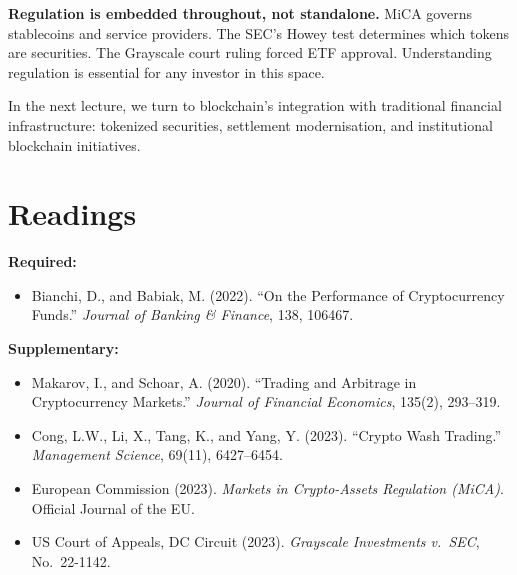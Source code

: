 \documentclass[11pt,a4paper]{article}
\begin{document}
\textbf{Regulation is embedded throughout, not standalone.} MiCA governs stablecoins and service providers. The SEC's Howey test determines which tokens are securities. The Grayscale court ruling forced ETF approval. Understanding regulation is essential for any investor in this space.

In the next lecture, we turn to blockchain's integration with traditional financial infrastructure: tokenized securities, settlement modernisation, and institutional blockchain initiatives.

\section*{Readings}

\textbf{Required:}
\begin{itemize}
    \item Bianchi, D., and Babiak, M. (2022). ``On the Performance of Cryptocurrency Funds.'' \textit{Journal of Banking \& Finance}, 138, 106467.
\end{itemize}

\textbf{Supplementary:}
\begin{itemize}
    \item Makarov, I., and Schoar, A. (2020). ``Trading and Arbitrage in Cryptocurrency Markets.'' \textit{Journal of Financial Economics}, 135(2), 293--319.
    \item Cong, L.W., Li, X., Tang, K., and Yang, Y. (2023). ``Crypto Wash Trading.'' \textit{Management Science}, 69(11), 6427--6454.
    \item European Commission (2023). \textit{Markets in Crypto-Assets Regulation (MiCA)}. Official Journal of the EU.
    \item US Court of Appeals, DC Circuit (2023). \textit{Grayscale Investments v.\ SEC}, No.\ 22-1142.
\end{itemize}

\end{document}
